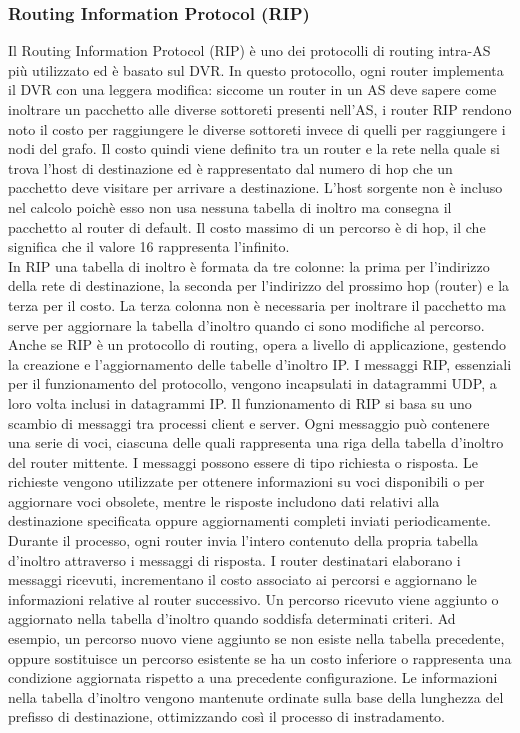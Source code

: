 \documentclass[12pt]{report}
\begin{document}
\subsubsection{Routing Information Protocol (RIP)}
Il Routing Information Protocol (RIP) è uno dei protocolli di routing intra-AS più utilizzato ed è basato sul DVR. In questo protocollo, ogni router implementa il DVR con una leggera modifica: siccome un router in un AS deve sapere come inoltrare un pacchetto alle diverse sottoreti presenti nell'AS, i router RIP rendono noto il costo per raggiungere le diverse sottoreti invece di quelli per raggiungere i nodi del grafo. Il costo quindi viene definito tra un router e la rete nella quale si trova l'host di destinazione ed è rappresentato dal numero di hop che un pacchetto deve visitare per arrivare a destinazione. L'host sorgente non è incluso nel calcolo poichè esso non usa nessuna tabella di inoltro ma consegna il pacchetto al router di default. Il costo massimo di un percorso è di  hop, il che significa che il valore 16 rappresenta l'infinito.
\vspace{\baselineskip}\\
In RIP una tabella di inoltro è formata da tre colonne: la prima per l'indirizzo della rete di destinazione, la seconda per l'indirizzo del prossimo hop (router) e la terza per il costo. La terza colonna non è necessaria per inoltrare il pacchetto ma serve per aggiornare la tabella d'inoltro quando ci sono modifiche al percorso.
\vspace{\baselineskip}\\
Anche se RIP è un protocollo di routing, opera a livello di applicazione, gestendo la creazione e l'aggiornamento delle tabelle d'inoltro IP. I messaggi RIP, essenziali per il funzionamento del protocollo, vengono incapsulati in datagrammi UDP, a loro volta inclusi in datagrammi IP. Il funzionamento di RIP si basa su uno scambio di messaggi tra processi client e server. Ogni messaggio può contenere una serie di voci, ciascuna delle quali rappresenta una riga della tabella d'inoltro del router mittente. I messaggi possono essere di tipo richiesta o risposta. Le richieste vengono utilizzate per ottenere informazioni su voci disponibili o per aggiornare voci obsolete, mentre le risposte includono dati relativi alla destinazione specificata oppure aggiornamenti completi inviati periodicamente.
\vspace{\baselineskip}\\
Durante il processo, ogni router invia l'intero contenuto della propria tabella d'inoltro attraverso i messaggi di risposta. I router destinatari elaborano i messaggi ricevuti, incrementano il costo associato ai percorsi e aggiornano le informazioni relative al router successivo. Un percorso ricevuto viene aggiunto o aggiornato nella tabella d'inoltro quando soddisfa determinati criteri. Ad esempio, un percorso nuovo viene aggiunto se non esiste nella tabella precedente, oppure sostituisce un percorso esistente se ha un costo inferiore o rappresenta una condizione aggiornata rispetto a una precedente configurazione. Le informazioni nella tabella d'inoltro vengono mantenute ordinate sulla base della lunghezza del prefisso di destinazione, ottimizzando così il processo di instradamento.
\end{document}
